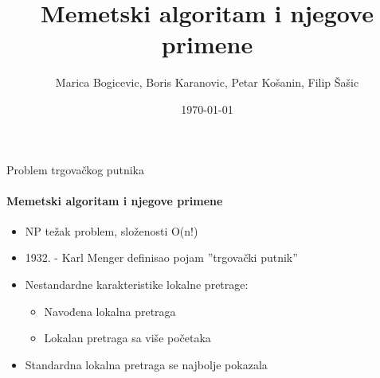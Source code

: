 \documentclass{beamer}
\title{Memetski algoritam i njegove primene}
\subtitle{}
\date{\today}
\author{Marica Bogicevic, Boris Karanovic, Petar Košanin, Filip Šašic}
\institute{Matematicki Fakultet}
\begin{document}
\maketitle


  



\begin{frame}[fragile]{Problem trgovačkog putnika}
  \framesubtitle{Memetski algoritam i njegove primene}
  
   \begin{itemize}
    \item{NP težak problem, složenosti O(n!)}
    \item{1932. - Karl Menger definisao pojam ''trgovački putnik'' }
     \item{Nestandardne karakteristike lokalne pretrage:}
        \begin{itemize}
             \item{Navođena lokalna pretraga}
             \item{Lokalan pretraga sa više početaka}
        \end{itemize}
     \item{Standardna lokalna pretraga se najbolje pokazala}
  \end{itemize}

\end{frame}
\end{document}
